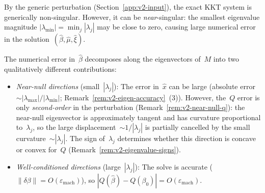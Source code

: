 \begin{remark}%
\label{rem:v2-error-decomposition}
By the generic perturbation (Section~\ref{app:v2-input}),
the exact KKT system is generically non-singular.
However, it can be \emph{near}-singular:
the smallest eigenvalue magnitude
$|\lambda_{\min}| = \min_j |\lambda_j|$ may be close
to zero, causing large numerical error in the
solution~$(\hat\beta, \hat\mu, \hat\xi)$.

The numerical error in~$\hat\beta$ decomposes along the
eigenvectors of~$M$ into two qualitatively different
contributions:
\begin{itemize}
\item \emph{Near-null directions}
  (small~$|\lambda_j|$):
  The error in~$\hat x$ can be large
  (absolute error~$\sim |\lambda_{\max}|/|\lambda_{\min}|$;
  Remark~\ref{rem:v2-eigen-accuracy}~(3)).
  However, the~$Q$ error is only
  \emph{second-order} in the perturbation
  (Remark~\ref{rem:v2-near-null-q}):
  the near-null eigenvector is approximately tangent
  and has curvature proportional to~$\lambda_j$,
  so the large displacement~$\sim 1/|\lambda_j|$
  is partially cancelled by the
  small curvature~$\sim |\lambda_j|$.
  The sign of~$\lambda_j$ determines whether
  this direction is concave or convex for~$Q$
  (Remark~\ref{rem:v2-eigenvalue-signs}).

\item \emph{Well-conditioned directions}
  (large~$|\lambda_j|$):
  The solve is accurate
  ($\|\delta\beta\| = O(\varepsilon_{\mathrm{mach}})$),
  so
  $|Q(\hat\beta) - Q(\beta_0)|
    = O(\varepsilon_{\mathrm{mach}})$.
\end{itemize}
\end{remark}


